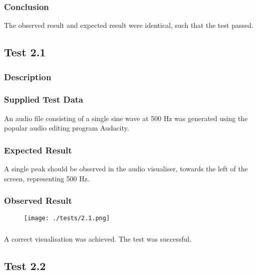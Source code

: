 \subsubsection{Conclusion}
The observed result and expected result were identical, such that the test passed.

\pagebreak
\subsection{Test 2.1}
\subsubsection{Description}
\paragraph{}
{
	\centering
}

\subsubsection{Supplied Test Data}
An audio file consisting of a single sine wave at 500 Hz was generated using the popular audio editing program Audacity.

\subsubsection{Expected Result}
A single peak should be observed in the audio visualiser, towards the left of the screen, representing 500 Hz.

\subsubsection{Observed Result}
\begin{figure}[H]
	\texttt{[image: ./tests/2.1.png]}
\end{figure}

\subsubsection{}
A correct visualisation was achieved. The test was successful.

\pagebreak
\subsection{Test 2.2}
